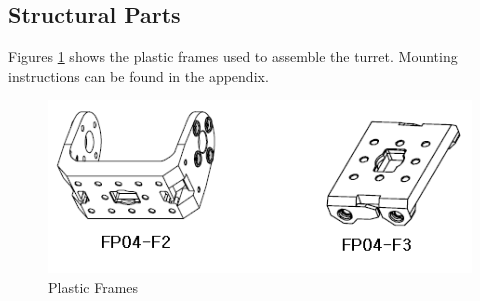 \subsection{Structural Parts}
Figures \ref{fig:axFrames} shows the plastic frames used to assemble the turret. Mounting instructions can be found in the appendix. 
\begin{figure}
	\centering
	\includegraphics[width=\textwidth]{img/axFrames.png}%
	\caption{Plastic Frames}
	\label{fig:axFrames}
\end{figure}

